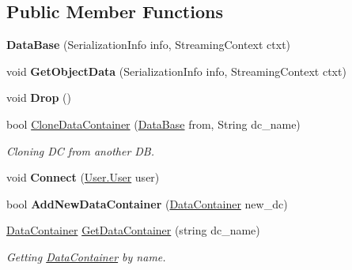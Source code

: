 \subsection*{Public Member Functions}
\begin{DoxyCompactItemize}
\item 
\hypertarget{class_dwarf_d_b_1_1_data_structures_1_1_data_base_a9748f9609030f61d1cfc28a162a48ad5}{
{\bfseries DataBase} (SerializationInfo info, StreamingContext ctxt)}
\label{class_dwarf_d_b_1_1_data_structures_1_1_data_base_a9748f9609030f61d1cfc28a162a48ad5}

\item 
\hypertarget{class_dwarf_d_b_1_1_data_structures_1_1_data_base_a34980ba6f61e15d6dcbe5af7f596a6fd}{
void {\bfseries GetObjectData} (SerializationInfo info, StreamingContext ctxt)}
\label{class_dwarf_d_b_1_1_data_structures_1_1_data_base_a34980ba6f61e15d6dcbe5af7f596a6fd}

\item 
\hypertarget{class_dwarf_d_b_1_1_data_structures_1_1_data_base_ae169105e97a66c5d621b3d945d11fce4}{
void {\bfseries Drop} ()}
\label{class_dwarf_d_b_1_1_data_structures_1_1_data_base_ae169105e97a66c5d621b3d945d11fce4}

\item 
bool \hyperlink{class_dwarf_d_b_1_1_data_structures_1_1_data_base_af1cedf55fdab7efe9154ea7570c9abc9}{CloneDataContainer} (\hyperlink{class_dwarf_d_b_1_1_data_structures_1_1_data_base}{DataBase} from, String dc\_\-name)
\begin{DoxyCompactList}\small\item\em Cloning DC from another DB. \item\end{DoxyCompactList}\item 
\hypertarget{class_dwarf_d_b_1_1_data_structures_1_1_data_base_ae0180400ee59265e19a5d981f59ca440}{
void {\bfseries Connect} (\hyperlink{class_dwarf_d_b_1_1_user_1_1_user}{User.User} user)}
\label{class_dwarf_d_b_1_1_data_structures_1_1_data_base_ae0180400ee59265e19a5d981f59ca440}

\item 
\hypertarget{class_dwarf_d_b_1_1_data_structures_1_1_data_base_a251d5fa0ba9b21d911a9a1c5dcf33152}{
bool {\bfseries AddNewDataContainer} (\hyperlink{class_dwarf_d_b_1_1_data_structures_1_1_data_container}{DataContainer} new\_\-dc)}
\label{class_dwarf_d_b_1_1_data_structures_1_1_data_base_a251d5fa0ba9b21d911a9a1c5dcf33152}

\item 
\hyperlink{class_dwarf_d_b_1_1_data_structures_1_1_data_container}{DataContainer} \hyperlink{class_dwarf_d_b_1_1_data_structures_1_1_data_base_aa554e79937460eb937b90d81093019b5}{GetDataContainer} (string dc\_\-name)
\begin{DoxyCompactList}\small\item\em Getting \hyperlink{class_dwarf_d_b_1_1_data_structures_1_1_data_container}{DataContainer} by name. \item\end{DoxyCompactList}\end{DoxyCompactItemize}
